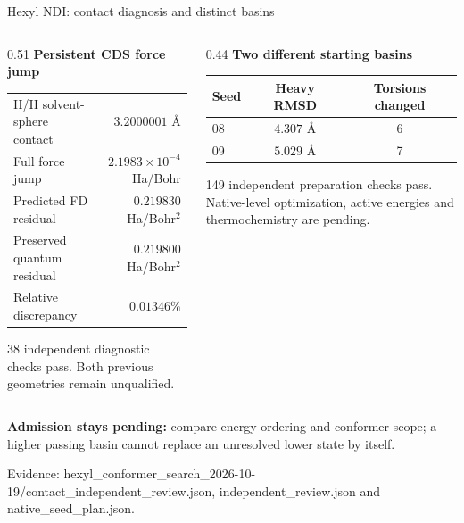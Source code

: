 \begin{frame}{Hexyl NDI: contact diagnosis and distinct basins}
\small
\begin{columns}[T]
\begin{column}{0.51\textwidth}
\textbf{Persistent CDS force jump}\par\vspace{1ex}
{\scriptsize\begin{tabular}{@{}lr@{}}\toprule
H/H solvent-sphere contact & $3.2000001$ \AA\\
Full force jump & $2.1983\!\times\!10^{-4}$ Ha/Bohr\\
Predicted FD residual & $0.219830$ Ha/Bohr$^2$\\
Preserved quantum residual & $0.219800$ Ha/Bohr$^2$\\
Relative discrepancy & $0.01346\%$\\\bottomrule
\end{tabular}}\par\vspace{1ex}
\footnotesize 38 independent diagnostic checks pass.
Both previous geometries remain unqualified.
\end{column}
\begin{column}{0.44\textwidth}
\textbf{Two different starting basins}\par\vspace{1ex}
{\scriptsize\begin{tabular}{@{}lcc@{}}\toprule
Seed & Heavy RMSD & Torsions changed\\
\midrule
08 & $4.307$ \AA & 6\\
09 & $5.029$ \AA & 7\\\bottomrule
\end{tabular}}\par\vspace{1ex}
\footnotesize 149 independent preparation checks pass.
Native-level optimization, active energies and thermochemistry are pending.
\end{column}
\end{columns}
\vfill\footnotesize
\textbf{Admission stays pending:} compare energy ordering and conformer scope;
a higher passing basin cannot replace an unresolved lower state by itself.
\par\vspace{0.5ex}\scriptsize
Evidence: hexyl\_conformer\_search\_2026-10-19/contact\_independent\_review.json,
independent\_review.json and native\_seed\_plan.json.
\end{frame}
